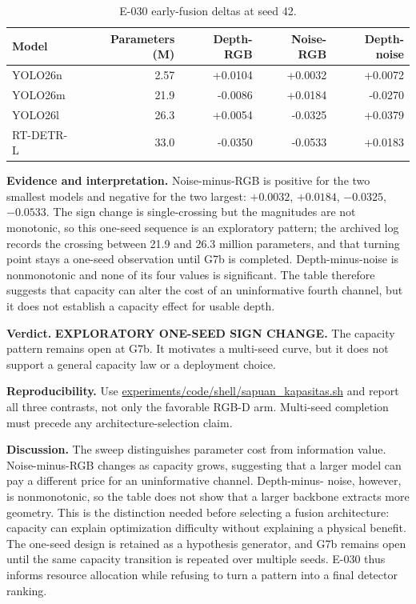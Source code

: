 \documentclass[preprint,12pt]{elsarticle}
\newcommand{\pathcode}[1]{\scriptsize\url{#1}}
\begin{document}
\begin{table}[H]
\centering
\caption{E-030 early-fusion deltas at seed 42.}
\label{tab:e030}
\begin{tabular}{lrrrr}
\toprule
Model & Parameters (M) & Depth-RGB & Noise-RGB & Depth-noise\\
\midrule
YOLO26n & 2.57 & +0.0104 & +0.0032 & +0.0072\\
YOLO26m & 21.9 & -0.0086 & +0.0184 & -0.0270\\
YOLO26l & 26.3 & +0.0054 & -0.0325 & +0.0379\\
RT-DETR-L & 33.0 & -0.0350 & -0.0533 & +0.0183\\
\bottomrule
\end{tabular}
\end{table}

\textbf{Evidence and interpretation.} Noise-minus-RGB is positive for the two
smallest models and negative for the two largest: \(+0.0032\), \(+0.0184\),
\(-0.0325\), \(-0.0533\). The sign change is single-crossing but the
magnitudes are not monotonic, so this one-seed sequence is an exploratory
pattern; the archived log records the crossing between 21.9 and 26.3 million
parameters, and that turning point stays a one-seed observation until G7b is
completed. Depth-minus-noise is nonmonotonic and none of its four values is
significant. The table therefore suggests that capacity can alter the cost of
an uninformative fourth channel, but it does not establish a capacity effect
for usable depth.

\textbf{Verdict.} \textbf{EXPLORATORY ONE-SEED SIGN CHANGE.} The capacity
pattern remains open at G7b. It motivates a multi-seed curve, but it does not
support a general capacity law or a deployment choice.

\textbf{Reproducibility.} Use \pathcode{experiments/code/shell/sapuan_kapasitas.sh} and report
all three contrasts, not only the favorable RGB-D arm. Multi-seed completion
must precede any architecture-selection claim.

\textbf{Discussion.} The sweep distinguishes parameter cost from information
value. Noise-minus-RGB changes as capacity grows, suggesting that a larger
model can pay a different price for an uninformative channel. Depth-minus-
noise, however, is nonmonotonic, so the table does not show that a larger
backbone extracts more geometry. This is the distinction needed before
selecting a fusion architecture: capacity can explain optimization
difficulty without explaining a physical benefit. The one-seed design is
retained as a hypothesis generator, and G7b remains open until the same
capacity transition is repeated over multiple seeds. E-030 thus informs
resource allocation while refusing to turn a pattern into a final detector
ranking.
\end{document}
